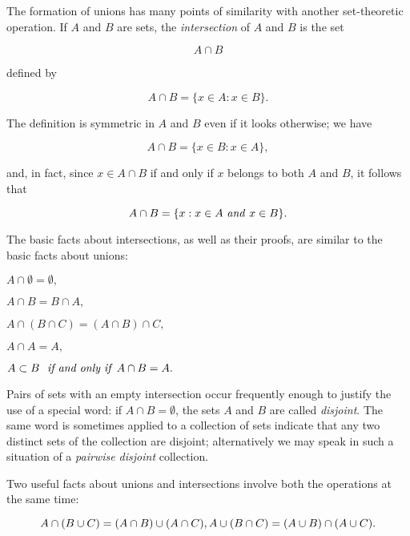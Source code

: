 The formation of unions has many points of similarity with another set-theoretic operation. If $A$ and $B$ are sets, the \textit{intersection} of $A$ and $B$ is the set 

\begin{equation*}
A \cap B
\end{equation*}

defined by 

\begin{equation*}
A \cap B = \{ x \in A: x \in B \}.
\end{equation*}

The definition is symmetric in $A$ and $B$ even if it looks otherwise; we have 

\begin{equation*}
A \cap B = \{ x \in B: x \in A \},
\end{equation*}

and, in fact, since $x \in A \cap B$ if and only if $x$ belongs to both $A$ and $B$, it follows that 

\begin{equation*}
A \cap B = \{x: x \in A \text{ \textit{and} } x \in B \}.
\end{equation*}

The basic facts about intersections, as well as their proofs, are similar to the basic facts about unions:

\begin{center}
$A \cap \emptyset = \emptyset ,$

$ A \cap B =  B \cap A,$

$A \cap (B \cap C) = (A \cap B) \cap C,$

$A \cap A = A,$

$A \subset B \text{ \textit{ if and only if} } A \cap B = A.$
\end{center}

Pairs of sets with an empty intersection occur frequently enough to justify the use of a special word: if $A \cap B =  \emptyset $, the sets $A$ and $B$ are called \textit{disjoint}. The same word is sometimes applied to a collection of sets indicate that any two distinct sets of the collection are disjoint; alternatively we may speak in such a situation of a \textit{pairwise disjoint} collection.
 
Two useful facts about unions and intersections involve both the operations at the same time: 

\begin{equation*}
A \cap (B \cup C) = (A \cap B) \cup (A \cap C),\\
A \cup (B \cap C) = (A \cup B) \cap (A \cup C).\\
\end{equation*}

